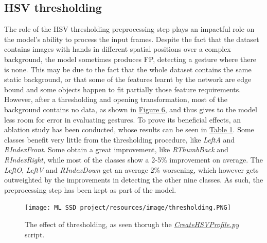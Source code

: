 \documentclass[10pt,twocolumn,letterpaper]{article}
\begin{document}
\subsection{HSV thresholding}
\begin{flushleft}
The role of the HSV thresholding preprocessing step plays an impactful role on the model's ability to process the input frames. Despite the fact that the dataset contains images with hands in different spatial positions over a complex background, the model sometimes produces FP, detecting a gesture where there is none. This may be due to the fact that the whole dataset contains the same static background, or that some of the features learnt by the network are edge bound and some objects happen to fit partially those feature requirements. However, after a thresholding and opening transformation, most of the background contains no data, as shown in \hyperref[figure6]{Figure 6}, and thus gives to the model less room for error in evaluating gestures. To prove its beneficial effects, an ablation study has been conducted, whose results can be seen in \hyperref[table1]{Table 1}.
Some classes benefit very little from the thresholding procedure, like \textit{LeftA} and \textit{RIndexFront}. Some obtain a great improvement, like \textit{RThumbBack} and \textit{RIndexRight}, while most of the classes show a 2-5\% improvement on average. The \textit{LeftO}, \textit{LeftV} and \textit{RIndexDown} get an average 2\% worsening, which however gets outweighted by the improvements in detecting the other nine classes. As such, the preprocessing step has been kept as part of the model.

\begin{figure}[!h]
    \centering
    \texttt{[image: ML SSD project/resources/image/thresholding.PNG]}
    \caption{The effect of thresholding, as seen thorugh the \textit{\href{https://github.com/MarzioVallero/ML-Based-Blender-Gestural-Input-Interface/blob/master/CreateHSVProfile.py}{CreateHSVProfile.py}} script.}
\end{figure}
\label{figure6}

\end{flushleft}
\end{document}
